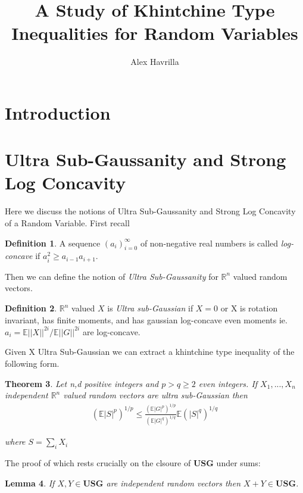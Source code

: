 \documentclass[10pt]{article}
\title{\vspace{-3em}A Study of Khintchine Type Inequalities for Random Variables}
\author{Alex Havrilla}
\newcommand{\E}{\mathbb{E}}
\newcommand{\1}{\textbf{1}}
\newcommand{\R}{\mathbb{R}}
\newcommand{\norm}[1]{||#1||}
\newtheorem{theorem}{Theorem}
\newtheorem{lemma}[theorem]{Lemma}
\theoremstyle{remark}
\theoremstyle{definition}
\newtheorem{defn}[theorem]{Definition}
\begin{document}
\maketitle

\section{Introduction}

\section{Ultra Sub-Gaussanity and Strong Log Concavity}

Here we discuss the notions of Ultra Sub-Gaussanity and Strong Log Concavity of a Random Variable. First recall

\begin{defn}
	A sequence $(a_i)_{i=0}^{\infty}$ of non-negative real numbers is called \textit{log-concave} if $a_i^2 \geq a_{i-1}a_{i+1}$.
\end{defn}

Then we can define the notion of \textit{Ultra Sub-Gaussanity} for $\R^n$ valued random vectors.

\begin{defn}
	$\R^n$ valued $X$ is \textit{Ultra sub-Gaussian} if $X=0$ or X is rotation invariant, has finite moments, and has gaussian log-concave even moments ie. $a_i = \E \norm{X}^{2i}/\E \norm{G}^{2i}$ are log-concave.
\end{defn}

Given X Ultra Sub-Gaussian we can extract a khintchine type inequality of the following form.

\begin{theorem}
	Let n,d positive integers and $p > q \geq 2$ even integers. If $X_1,...,X_n$ independent $\R^n$ valued random vectors are ultra sub-Gaussian then
	\begin{align*}
		(\E |S|^p)^{1/p} \leq \frac{(\E|G|^p)^{1/p}}{(\E|G|^q)^{1/q}}\E (|S|^q)^{1/q}
	\end{align*}

	where $S = \sum_i X_i$
\end{theorem}

The proof of which rests crucially on the clsoure of \textbf{USG} under sums:

\begin{lemma}
	If $X,Y \in \textbf{USG}$ are independent random vectors then $X+Y \in \textbf{USG}$.
\end{lemma}
\end{document}
